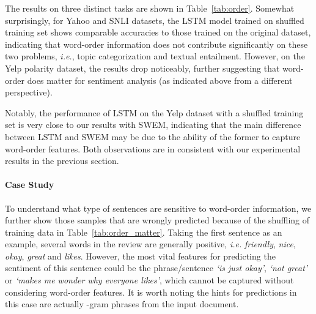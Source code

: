 \documentclass[11pt,a4paper]{article}
\begin{document}
The results on three distinct tasks are shown in Table~\ref{tab:order}.
Somewhat surprisingly, for Yahoo and SNLI datasets, the LSTM model trained on shuffled training set shows comparable accuracies to those trained on the original dataset, indicating that word-order information does not contribute significantly on these two problems, \emph{i.e.}, topic categorization and textual entailment.
However, on the Yelp polarity dataset, the results drop noticeably, further suggesting that word-order does matter for sentiment analysis (as indicated above from a different perspective). 

Notably, the performance of LSTM on the Yelp dataset with a shuffled training set is very close to our results with SWEM, indicating that the main difference between LSTM and SWEM may be due to the ability of the former to capture word-order features. Both observations are in consistent with our experimental results in the previous section.

\begin{table}[t!]
\centering
{}
\caption{Test samples from Yelp Polarity dataset for which LSTM gives wrong predictions with shuffled training data, but predicts correctly with the original training set.}
\label{tab:order_matter}
	\vspace{-4mm}
\end{table}

\paragraph{Case Study}To understand what type of sentences are sensitive to word-order information, we further show those samples that are wrongly predicted because of the shuffling of training data in Table~\ref{tab:order_matter}.
Taking the first sentence as an example, several words in the review are generally positive, \emph{i.e.} \emph{friendly}, \emph{nice}, \emph{okay}, \emph{great} and \emph{likes}.
However, the most vital features for predicting the sentiment of this sentence could be the phrase/sentence \emph{`is just okay'}, \emph{`not great'} or \emph{`makes me wonder why everyone likes'}, which cannot be captured without considering word-order features. 
It is worth noting the hints for predictions in this case are actually -gram phrases from the input document. 
\end{document}
